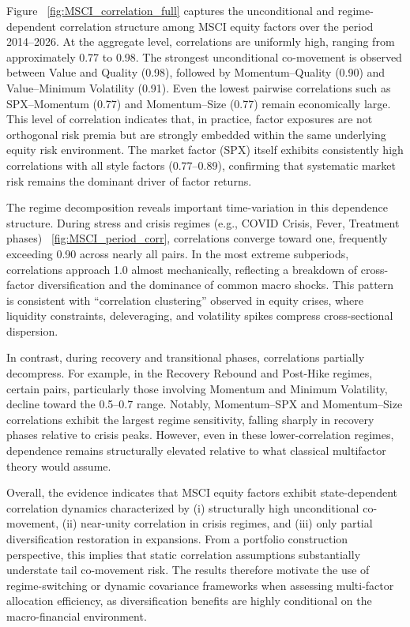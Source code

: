 \documentclass{article}
\begin{document}
Figure ~\ref{fig:MSCI_correlation_full} captures the unconditional and regime-dependent correlation structure among MSCI equity factors over the period 2014–2026. At the aggregate level, correlations are uniformly high, ranging from approximately 0.77 to 0.98. The strongest unconditional co-movement is observed between Value and Quality (0.98), followed by Momentum–Quality (0.90) and Value–Minimum Volatility (0.91). Even the lowest pairwise correlations such as SPX–Momentum (0.77) and Momentum–Size (0.77) remain economically large. This level of correlation indicates that, in practice, factor exposures are not orthogonal risk premia but are strongly embedded within the same underlying equity risk environment. The market factor (SPX) itself exhibits consistently high correlations with all style factors (0.77–0.89), confirming that systematic market risk remains the dominant driver of factor returns.\newline

The regime decomposition reveals important time-variation in this dependence structure. During stress and crisis regimes (e.g., COVID Crisis, Fever, Treatment phases) ~\ref{fig:MSCI_period_corr}, correlations converge toward one, frequently exceeding 0.90 across nearly all pairs. In the most extreme subperiods, correlations approach 1.0 almost mechanically, reflecting a breakdown of cross-factor diversification and the dominance of common macro shocks. This pattern is consistent with “correlation clustering” observed in equity crises, where liquidity constraints, deleveraging, and volatility spikes compress cross-sectional dispersion.\newline

In contrast, during recovery and transitional phases, correlations partially decompress. For example, in the Recovery Rebound and Post-Hike regimes, certain pairs, particularly those involving Momentum and Minimum Volatility, decline toward the 0.5–0.7 range. Notably, Momentum–SPX and Momentum–Size correlations exhibit the largest regime sensitivity, falling sharply in recovery phases relative to crisis peaks. However, even in these lower-correlation regimes, dependence remains structurally elevated relative to what classical multifactor theory would assume.\newline

Overall, the evidence indicates that MSCI equity factors exhibit state-dependent correlation dynamics characterized by (i) structurally high unconditional co-movement, (ii) near-unity correlation in crisis regimes, and (iii) only partial diversification restoration in expansions. From a portfolio construction perspective, this implies that static correlation assumptions substantially understate tail co-movement risk. The results therefore motivate the use of regime-switching or dynamic covariance frameworks when assessing multi-factor allocation efficiency, as diversification benefits are highly conditional on the macro-financial environment.\newline
\end{document}
